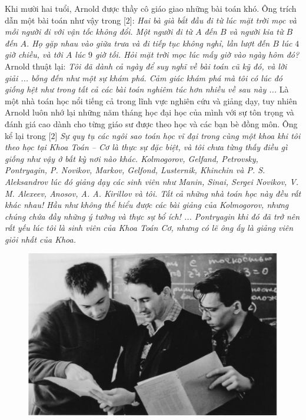 \begin{multicols}{2}
	\vskip 0.1cm
	Khi mười hai tuổi, Arnold được thầy cô giáo  giao những bài toán khó. Ông trích dẫn một bài toán  như vậy trong [$2$]:
	\vskip 0.1cm
	\textit{Hai bà già bắt đầu đi từ lúc mặt trời mọc và mỗi người đi với vận tốc không đổi. Một người đi từ $A$ đến $B$ và người kia từ $B$ đến $A$. Họ gặp nhau vào giữa trưa và đi tiếp tục không nghỉ, lần lượt đến $B$ lúc $4$ giờ chiều,  và tới $A$ lúc $9$ giờ tối. Hỏi mặt trời mọc lúc mấy giờ vào ngày hôm đó?}
	\vskip 0.1cm
	Arnold thuật lại: 
	\vskip 0.1cm
	\textit{Tôi đã dành cả ngày để suy nghĩ về bài toán cũ kỹ đó, và lời giải ...  bỗng đến như một sự khám phá. Cảm giác khám phá mà tôi có lúc đó giống hệt như trong tất cả các bài toán nghiêm túc hơn nhiều về sau này ...}
	\vskip 0.1cm
	Là một nhà toán học nổi tiếng cả trong lĩnh vực nghiên cứu và giảng dạy, tuy nhiên Arnold luôn nhớ lại những năm tháng học đại học của mình với sự tôn trọng và đánh giá cao dành cho từng giáo sư được theo học và các bạn bè đồng môn. Ông kể lại trong [$2$]
	\vskip 0.1cm
	\textit{Sự quy tụ các ngôi sao toán học vĩ đại  trong cùng một khoa khi tôi theo học tại Khoa Toán -- Cơ là thực sự đặc biệt, và tôi chưa từng thấy điều gì giống như vậy ở bất kỳ nơi nào khác. Kolmogorov, Gelfand, Petrovsky, Pontryagin, P. Novikov, Markov, Gelfond, Lusternik, Khinchin và P. S. Aleksandrov lúc đó giảng dạy các sinh viên như Manin, Sinai, Sergei Novikov, V. M. Alexeev, Anosov, A. A. Kirillov và tôi. Tất cả những nhà toán học này đều rất khác nhau! Hầu như không thể hiểu được các bài giảng của Kolmogorov, nhưng chúng chứa đầy những ý tưởng và thực sự bổ ích! ... Pontryagin khi đó đã trở nên rất yếu lúc tôi là sinh viên của Khoa Toán Cơ, nhưng có lẽ ông ấy là giảng viên giỏi nhất của Khoa.}
	\begin{figure}[H]
		\vspace*{-5pt}
		\centering
		\captionsetup{labelformat= empty, justification=centering}
		\includegraphics[width= 1\linewidth]{2}

\end{figure}
\end{multicols}
